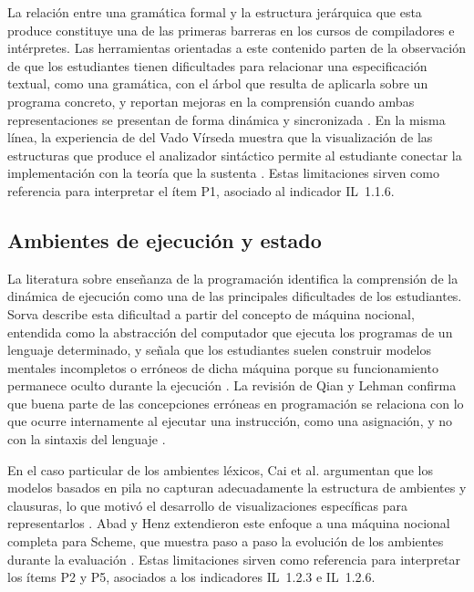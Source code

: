 La relación entre una gramática formal y la estructura jerárquica que esta produce constituye una de las primeras barreras en los cursos de compiladores e intérpretes. Las herramientas orientadas a este contenido parten de la observación de que los estudiantes tienen dificultades para relacionar una especificación textual, como una gramática, con el árbol que resulta de aplicarla sobre un programa concreto, y reportan mejoras en la comprensión cuando ambas representaciones se presentan de forma dinámica y sincronizada \cite{jovanovic2021comvis, Stamenkovic2024AWE}. En la misma línea, la experiencia de del Vado Vírseda muestra que la visualización de las estructuras que produce el analizador sintáctico permite al estudiante conectar la implementación con la teoría que la sustenta \cite{delvado2023itt}. Estas limitaciones sirven como referencia para interpretar el ítem P1, asociado al indicador IL~1.1.6.

\subsection{Ambientes de ejecución y estado}

La literatura sobre enseñanza de la programación identifica la comprensión de la dinámica de ejecución como una de las principales dificultades de los estudiantes. Sorva describe esta dificultad a partir del concepto de máquina nocional, entendida como la abstracción del computador que ejecuta los programas de un lenguaje determinado, y señala que los estudiantes suelen construir modelos mentales incompletos o erróneos de dicha máquina porque su funcionamiento permanece oculto durante la ejecución \cite{sorva2013notional}. La revisión de Qian y Lehman confirma que buena parte de las concepciones erróneas en programación se relaciona con lo que ocurre internamente al ejecutar una instrucción, como una asignación, y no con la sintaxis del lenguaje \cite{qian2017misconceptions}.

En el caso particular de los ambientes léxicos, Cai et al. argumentan que los modelos basados en pila no capturan adecuadamente la estructura de ambientes y clausuras, lo que motivó el desarrollo de visualizaciones específicas para representarlos \cite{Cai2023VisualizingEnvironments}. Abad y Henz extendieron este enfoque a una máquina nocional completa para Scheme, que muestra paso a paso la evolución de los ambientes durante la evaluación \cite{Abad2024BeyondSICP}. Estas limitaciones sirven como referencia para interpretar los ítems P2 y P5, asociados a los indicadores IL~1.2.3 e IL~1.2.6.

